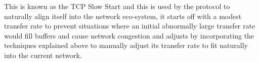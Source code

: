 This is known as the TCP Slow Start and this is used by the protocol to naturally align itself into the network eco-system, it starts off with a modest transfer rate to prevent situations where an initial abnormally large transfer rate would fill buffers and cause network congestion and adjusts by incorporating the techniques explained above to manually adjust its transfer rate to fit naturally into the current network.